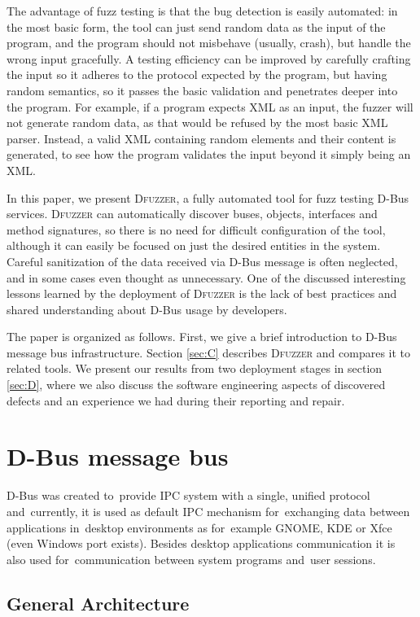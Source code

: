 \documentclass[conference]{IEEEtran}
\begin{document}
The advantage of fuzz testing is that the bug detection is easily automated: in
the most basic form, the tool can just send random data as the input of the
program, and the program should not misbehave (usually, crash), but handle the
wrong input gracefully. A testing efficiency can be improved by carefully
crafting the input so it adheres to the protocol expected by the program, but
having random semantics, so it passes the basic validation and penetrates deeper
into the program. For example, if a program expects XML as an input, the fuzzer
will not generate random data, as that would be refused by the most basic XML
parser. Instead, a valid XML containing random elements and their content is
generated, to see how the program validates the input beyond it simply being an
XML.

In this paper, we present \textsc{Dfuzzer}, a fully automated tool for fuzz
testing D-Bus services. \textsc{Dfuzzer} can automatically discover buses,
objects, interfaces and method signatures, so there is no need for difficult
configuration of the tool, although it can easily be focused on just the desired
entities in the system. Careful sanitization of the data received via D-Bus
message is often neglected, and in some cases even thought as unnecessary. One of
the discussed interesting lessons learned by the deployment of
\textsc{Dfuzzer} is the lack of best practices and shared understanding about
D-Bus usage by developers.

The paper is organized as follows. First, we give a brief introduction to D-Bus
message bus infrastructure. Section \ref{sec:C} describes \textsc{Dfuzzer} and compares
it to related tools. We present our results from two deployment stages in
section \ref{sec:D}, where we also discuss the software engineering aspects of
discovered defects and an experience we had during their reporting and repair.

\section{D-Bus message bus}
\label{sec:B}
D-Bus was created to~provide IPC system with a single, unified protocol
and~currently, it is used as default IPC mechanism for~exchanging data between
applications in~desktop environments as for~example GNOME, KDE or Xfce (even
Windows port exists). Besides desktop applications communication it is also used
for~communication between system programs and~user sessions.

\subsection{General Architecture}
\end{document}
